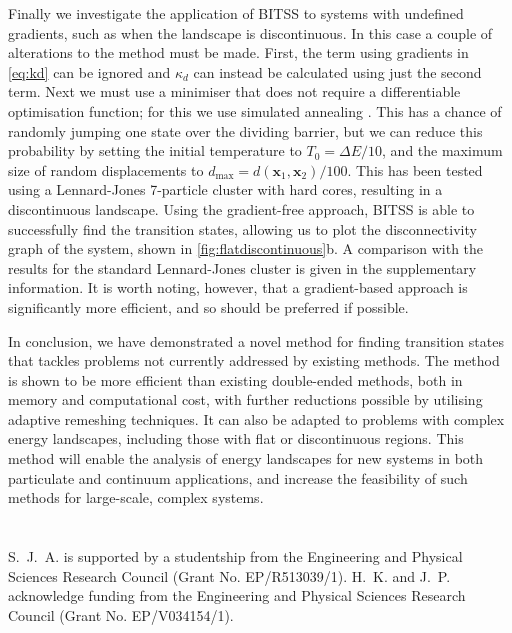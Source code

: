 \documentclass[aps,prl,twocolumn,groupedaddress]{revtex4}
\begin{document}
\topic Finally we investigate the application of BITSS to systems with undefined gradients, such as when the landscape is discontinuous.
In this case a couple of alterations to the method must be made.
First, the term using gradients in \cref{eq:kd} can be ignored and $\kappa_d$ can instead be calculated using just the second term.
Next we must use a minimiser that does not require a differentiable optimisation function; for this we use simulated annealing \cite{Kirkpatrick1983}.
This has a chance of randomly jumping one state over the dividing barrier, but we can reduce this probability by setting the initial temperature to $T_0 = \Delta E / 10$, and the maximum size of random displacements to $d_\text{max} = d(\bm{x}_1, \bm{x}_2) / 100$.
This has been tested using a Lennard-Jones 7-particle cluster with hard cores, resulting in a discontinuous landscape.
Using the gradient-free approach, BITSS is able to successfully find the transition states, allowing us to plot the disconnectivity graph of the system, shown in \cref{fig:flatdiscontinuous}b.
A comparison with the results for the standard Lennard-Jones cluster is given in the supplementary information.
It is worth noting, however, that a gradient-based approach is significantly more efficient, and so should be preferred if possible.


\topic In conclusion, we have demonstrated a novel method for finding transition states that tackles problems not currently addressed by existing methods.
The method is shown to be more efficient than existing double-ended methods, both in memory and computational cost, with further reductions possible by utilising adaptive remeshing techniques.
It can also be adapted to problems with complex energy landscapes, including those with flat or discontinuous regions.
This method will enable the analysis of energy landscapes for new systems in both particulate and continuum applications, and increase the feasibility of such methods for large-scale, complex systems.


\appendix
\section{}

\begin{acknowledgments}
  S.~J.~A. is supported by a studentship from the Engineering and Physical Sciences Research Council (Grant No. EP/R513039/1).
  H.~K. and J.~P. acknowledge funding from the Engineering and Physical Sciences Research Council (Grant No. EP/V034154/1).
\end{acknowledgments}

% 

\end{document}
